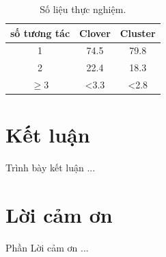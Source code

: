 \documentclass[11pt, a4paper, bold, center, twoside, journal]{paper}%
\begin{document}
\begin{table}[!htb]
\centering
	\caption{Số liệu thực nghiệm.}
	\label{tab:solieu} 
	\begin{tabular}{ccc}
		\hline
		số tương tác	& Clover 	& Cluster\\
		\hline
		1	& 74.5 & 79.8\\
		2	& 22.4 & 18.3\\
		$\ge$3	& <3.3 & <2.8\\
		\hline
	\end{tabular}
\end{table}

\section{Kết luận}
Trình bày kết luận ...



\section{Lời cảm ơn}
Phần Lời cảm ơn ...

 



\end{document}
